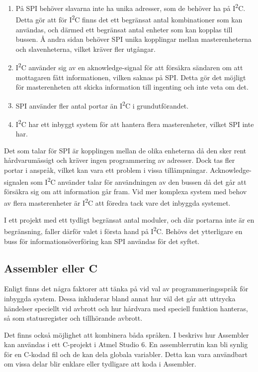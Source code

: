 \documentclass[11pt]{article}
\begin{document}
\begin{flushleft}
\begin{enumerate}
	\item På SPI behöver slavarna inte ha unika adresser, som de behöver ha på I\textsuperscript{2}C. Detta gör att för I\textsuperscript{2}C finns det ett begränsat antal kombinationer som kan användas, och därmed ett begränsat antal enheter som kan kopplas till bussen. Å andra sidan behöver SPI unika kopplingar mellan masterenheterna och slavenheterna, vilket kräver fler utgångar.
	\item I\textsuperscript{2}C använder sig av en aknowledge-signal för att försäkra sändaren om att mottagaren fått informationen, vilken saknas på SPI. Detta gör det möjligt för masterenheten att skicka information till ingenting och inte veta om det. 
	\item SPI använder fler antal portar än I\textsuperscript{2}C i grundutförandet.
	\item I\textsuperscript{2}C har ett inbyggt system för att hantera flera masterenheter, vilket SPI inte har.
\end{enumerate}

Det som talar för SPI är kopplingen mellan de olika enheterna då den sker rent hårdvarumässigt och kräver ingen programmering av adresser. Dock tas fler portar i anspråk, vilket kan vara ett problem i vissa tillämpningar. Acknowledge-signalen som I\textsuperscript{2}C använder talar för användningen av den bussen då det går att försäkra sig om att information går fram. Vid mer komplexa system med behov av flera masterenheter är I\textsuperscript{2}C att föredra tack vare det inbyggda systemet. 

I ett projekt med ett tydligt begränsat antal moduler, och där portarna inte är en begränsning, faller därför valet i första hand på I\textsuperscript{2}C. Behövs det ytterligare en buss för informationsöverföring kan SPI användas för det syftet.

\subsection{Assembler eller C}

Enligt \cite{CPC} finns det några faktorer att tänka på vid val av programmeringsspråk för inbyggda system. Dessa inkluderar bland annat hur väl det går att uttrycka händelser speciellt vid avbrott och hur hårdvara med speciell funktion hanteras, så som statusregister och tillhörande avbrott.  

Det finns också möjlighet att kombinera båda språken. I \cite{AssC} beskrivs hur Assembler kan användas i ett C-projekt i Atmel Studio 6. En assemblerrutin kan bli synlig för en C-kodad fil och de kan dela globala variabler. Detta kan vara användbart om vissa delar blir enklare eller tydligare att koda i Assembler.


\end{flushleft}
\end{document}
